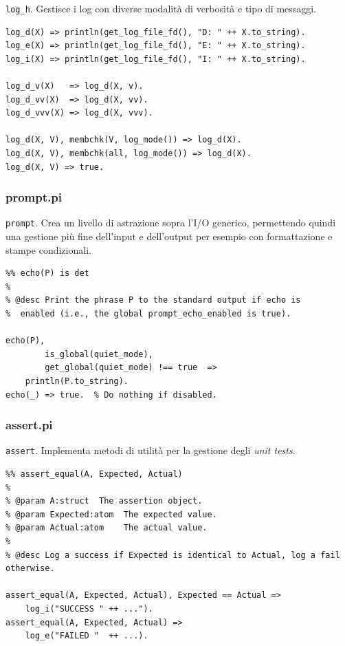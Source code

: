 \documentclass[12pt,a4paper,openright]{book} %
\begin{document}
\verb|log_h|. Gestisce i log con diverse modalità di verbosità e tipo di messaggi.

\begin{verbatim}
log_d(X) => println(get_log_file_fd(), "D: " ++ X.to_string).
log_e(X) => println(get_log_file_fd(), "E: " ++ X.to_string).
log_i(X) => println(get_log_file_fd(), "I: " ++ X.to_string).

log_d_v(X)   => log_d(X, v).
log_d_vv(X)  => log_d(X, vv).
log_d_vvv(X) => log_d(X, vvv).

log_d(X, V), membchk(V, log_mode()) => log_d(X).
log_d(X, V), membchk(all, log_mode()) => log_d(X).
log_d(X, V) => true.
\end{verbatim}

\subsubsection{prompt.pi}

\verb|prompt|. Crea un livello di astrazione sopra l'I/O generico, permettendo quindi una gestione più fine dell'input e dell'output per esempio con formattazione e stampe condizionali.

\begin{verbatim}
%% echo(P) is det
%
% @desc Print the phrase P to the standard output if echo is 
%  enabled (i.e., the global prompt_echo_enabled is true).

echo(P), 
        is_global(quiet_mode), 
        get_global(quiet_mode) !== true  => 
    println(P.to_string).
echo(_) => true.  % Do nothing if disabled.
\end{verbatim}

\subsubsection{assert.pi}

\verb|assert|. Implementa metodi di utilità per la gestione degli \emph{unit tests}.

\begin{verbatim}
%% assert_equal(A, Expected, Actual)
%
% @param A:struct  The assertion object.
% @param Expected:atom  The expected value.
% @param Actual:atom    The actual value.
%
% @desc Log a success if Expected is identical to Actual, log a fail otherwise.

assert_equal(A, Expected, Actual), Expected == Actual => 
    log_i("SUCCESS " ++ ...").
assert_equal(A, Expected, Actual) => 
    log_e("FAILED "  ++ ...).
\end{verbatim}
\end{document}
